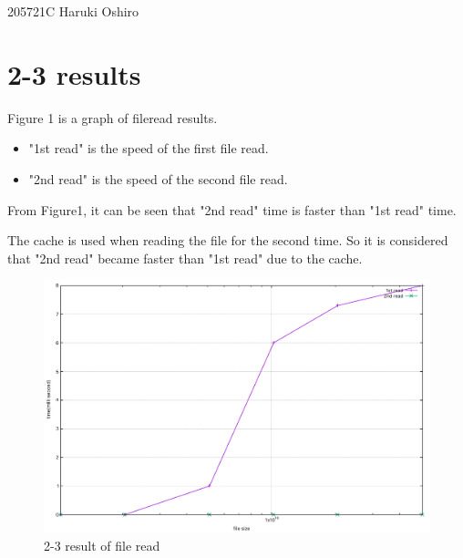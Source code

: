 \documentclass[a4paper,11pt,titlepage]{jsarticle}
\begin{document}
205721C Haruki Oshiro

\section{2-3 results}
Figure 1 is a graph of fileread results.
\begin{itemize}
    \item "1st read" is the speed of the first 
        file read.
    \item "2nd read" is the speed of the second
         file read.
\end{itemize}
 
From Figure1, it can be seen that "2nd read"
 time is faster than "1st read" time.

The cache is used when reading the file for the second time.
So it is considered that "2nd read" became faster than "1st read"
due to the cache.

\begin{figure}[H]
    \centering
    \includegraphics[scale=0.5]{./results/os23/2-3result.pdf}
    \renewcommand{\figurename}{Figure }
    \caption{2-3 result of file read}
\end{figure}
\end{document}
